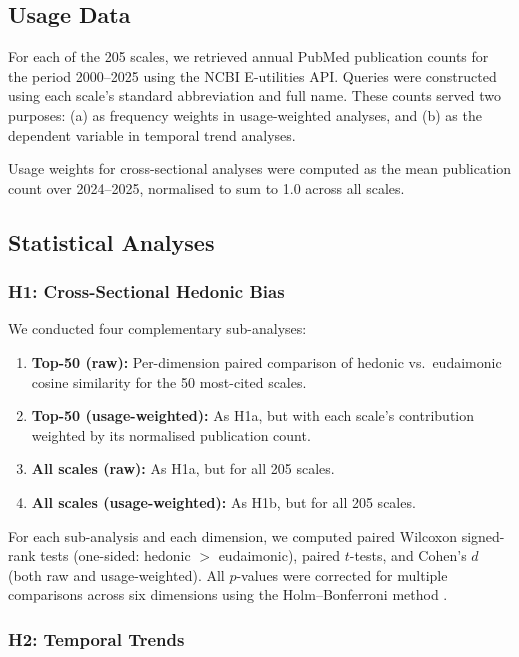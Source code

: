 \documentclass[12pt,a4paper]{article}
\begin{document}
\subsection{Usage Data}\label{sec:usage}

For each of the 205 scales, we retrieved annual PubMed publication counts for the period 2000--2025 using the NCBI E-utilities API.
Queries were constructed using each scale's standard abbreviation and full name.
These counts served two purposes: (a) as frequency weights in usage-weighted analyses, and (b) as the dependent variable in temporal trend analyses.

Usage weights for cross-sectional analyses were computed as the mean publication count over 2024--2025, normalised to sum to 1.0 across all scales.

\subsection{Statistical Analyses}\label{sec:stats}

\subsubsection{H1: Cross-Sectional Hedonic Bias}

We conducted four complementary sub-analyses:
\begin{enumerate}[label=H1\alph*:]
    \item \textbf{Top-50 (raw):} Per-dimension paired comparison of hedonic vs.\ eudaimonic cosine similarity for the 50 most-cited scales.
    \item \textbf{Top-50 (usage-weighted):} As H1a, but with each scale's contribution weighted by its normalised publication count.
    \item \textbf{All scales (raw):} As H1a, but for all 205 scales.
    \item \textbf{All scales (usage-weighted):} As H1b, but for all 205 scales.
\end{enumerate}

For each sub-analysis and each dimension, we computed paired Wilcoxon signed-rank tests (one-sided: hedonic $>$ eudaimonic), paired $t$-tests, and Cohen's $d$ (both raw and usage-weighted).
All $p$-values were corrected for multiple comparisons across six dimensions using the Holm--Bonferroni method \citep{holm1979simple}.

\subsubsection{H2: Temporal Trends}
\end{document}
